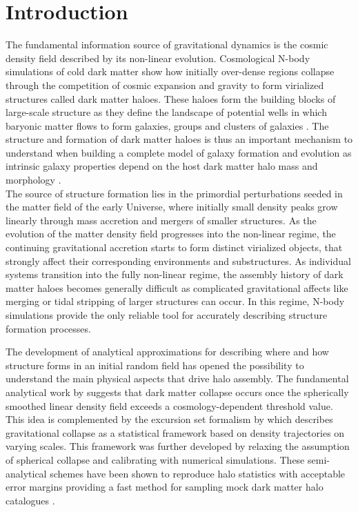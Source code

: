 \documentclass[fleqn,usenatbib]{mnras}
\begin{document}
\section{Introduction}
The fundamental information source of gravitational dynamics is the cosmic density field described by its non-linear evolution. Cosmological N-body simulations of cold dark matter show how initially over-dense regions collapse through the competition of cosmic expansion and gravity to form virialized structures called dark matter haloes.
These haloes form the building blocks of large-scale structure as they define the landscape of potential wells in which baryonic matter flows to form galaxies, groups and clusters of galaxies \cite[e.g.][]{Wechsler2018, Guo2010}. 
The structure and formation of dark matter haloes is thus an important mechanism to understand when building a complete model of galaxy formation and evolution as intrinsic galaxy properties depend on the host dark matter halo mass and morphology \cite[][]{Wechsler2018, Feldmann_2019}.\\

The source of structure formation lies in the primordial perturbations seeded in the matter field of the early Universe, where initially small density peaks grow linearly through mass accretion and mergers of smaller structures. As the evolution of the matter density field progresses into the non-linear regime, the continuing gravitational accretion starts to form distinct virialized objects, that strongly affect their corresponding environments and substructures. As individual systems transition into the fully non-linear regime, the assembly history of dark matter haloes becomes generally difficult as complicated gravitational affects like merging or tidal stripping of larger structures can occur. In this regime, N-body simulations provide the only reliable tool for accurately describing structure formation processes.\par

The development of analytical approximations for describing where and how structure forms in an initial random field has opened the possibility to understand the main physical aspects that drive halo assembly.
The fundamental analytical work by \cite{Press_Schechter1974} suggests that dark matter collapse occurs once the spherically smoothed linear density field exceeds a cosmology-dependent threshold value. This idea is complemented by the excursion set formalism by \cite{Bond1991} which describes gravitational collapse as a statistical framework based on density trajectories on varying scales. This framework was further developed by relaxing the assumption of spherical collapse and calibrating with numerical simulations.
These semi-analytical schemes have been shown to reproduce halo statistics with acceptable error margins providing a fast method for sampling mock dark matter halo catalogues \cite[][]{Sheth2001, Reed2003}.\\
\end{document}

